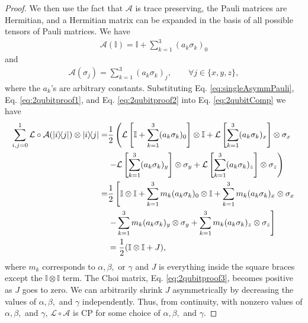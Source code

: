 \documentclass[12pt]{iopart}
\begin{document}
\begin{proof}
    We then use the fact that $\mathcal{A}$ is trace preserving, the Pauli matrices are Hermitian, and a Hermitian matrix can be expanded in the basis of all possible tensors of Pauli matrices. We have
    \begin{align}\label{eq:2qubitproof1}
        \mathcal{A}(\mathbb{I})=\mathbb{I}+\sum_{k=1}^3(a_k\sigma_k)_0
    \end{align}
    and
    \begin{align}\label{eq:2qubitproof2}
        \mathcal{A}(\sigma_j)=\sum_{k=1}^3(a_k\sigma_k)_j,\qquad \forall j\in\{x,y,z\},
    \end{align}
    where the $a_k$'s are arbitrary constants. Substituting Eq. \eqref{eq:singleAsymmPauli}, Eq. \eqref{eq:2qubitproof1}, and Eq. \eqref{eq:2qubitproof2} into Eq. \eqref{eq:2qubitComp} we have
    \begin{align}\label{eq:2qubitproof3}
        \notag\sum_{i,j=0}^1\mathcal{L}\circ\mathcal{A}(\op{i}{j})\otimes\op{i}{j}=&\dfrac{1}{2}\left(\mathcal{L}\left[\mathbb{I}+\sum_{k=1}^3(a_k\sigma_k)_0\right]\otimes\mathbb{I}+\mathcal{L}\left[\sum_{k=1}^3(a_k\sigma_k)_x\right]\otimes\sigma_x\right.\\
        \notag &\left.-\mathcal{L}\left[\sum_{k=1}^3(a_k\sigma_k)_y\right]\otimes\sigma_y+\mathcal{L}\left[\sum_{k=1}^3(a_k\sigma_k)_z\right]\otimes\sigma_z \right)\\
        \notag=&\dfrac{1}{2}\left[\mathbb{I}\otimes\mathbb{I}+\sum_{k=1}^3m_k(a_k\sigma_k)_0\otimes\mathbb{I}+\sum_{k=1}^3m_k(a_k\sigma_k)_x\otimes\sigma_x\right.\\
        \notag&\left. -\sum_{k=1}^3m_k(a_k\sigma_k)_y\otimes\sigma_y+\sum_{k=1}^3m_k(a_k\sigma_k)_z\otimes\sigma_z\right]\\
        &=\dfrac{1}{2}(\mathbb{I}\otimes\mathbb{I}+J),
    \end{align}
where $m_k$ corresponds to $\alpha, \beta,$ or $\gamma$ and $J$ is everything inside the square braces except the $\mathbb{I}\otimes \mathbb{I}$ term. The Choi matrix, Eq. \eqref{eq:2qubitproof3}, becomes positive as $J$ goes to zero. We can arbitrarily shrink $J$ asymmetrically by decreasing the values of $\alpha, \beta, $ and $\gamma$ independently. Thus, from continuity, with nonzero values of $\alpha, \beta, $ and $\gamma$, $\mathcal{L}\circ\mathcal{A}$ is CP for some choice of $\alpha, \beta, $ and $\gamma$.
\end{proof}
\end{document}
